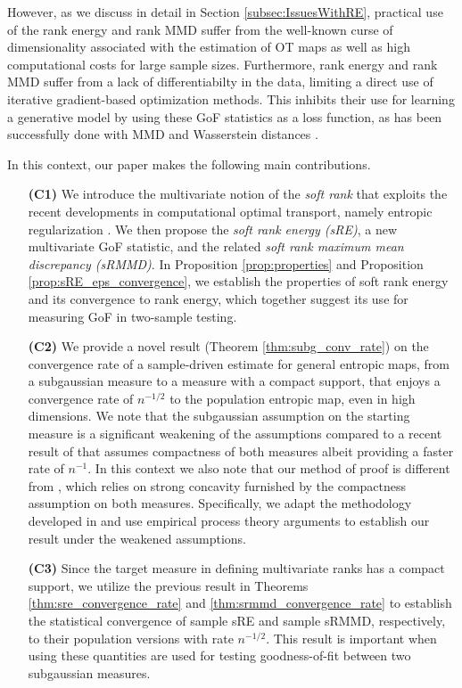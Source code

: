 \documentclass{article}
\theoremstyle{definition}
\begin{document}
However, as we discuss in detail in Section \ref{subsec:IssuesWithRE}, practical use of the rank energy and rank MMD suffer from the well-known curse of dimensionality associated with the estimation of OT maps as well as high computational costs for large sample sizes. Furthermore, rank energy and rank MMD suffer from a lack of differentiabilty in the data, limiting a direct use of iterative gradient-based optimization methods.  This inhibits their use for learning a generative model by using these GoF statistics as a loss function, as has been successfully done with MMD and Wasserstein distances \cite{li2017mmd, arjovsky2017wasserstein}.

In this context, our paper makes the following main contributions.
\begin{itemize}
    \item[\textbf{(C1)}] We introduce the multivariate notion of the \textit{soft rank} that exploits the recent developments in computational optimal transport, namely entropic regularization \cite{peyre2019computational}.  We then propose the \textit{soft rank energy (sRE)}, a new multivariate GoF statistic, and the related \emph{soft rank maximum mean discrepancy (sRMMD)}.  In Proposition \ref{prop:properties} and Proposition \ref{prop:sRE_eps_convergence}, we establish the  properties of soft rank energy and its convergence to rank energy, which together suggest its use for measuring GoF in two-sample testing. 
    
    \item[\textbf{(C2)}]  We provide a novel result (Theorem \ref{thm:subg_conv_rate}) on the convergence rate of a sample-driven estimate for general entropic maps, from a subgaussian measure to a measure with a compact support, that enjoys a convergence rate of $n^{-1/2}$ to the population entropic map, even in high dimensions. We note that the subgaussian assumption on the starting measure is a significant weakening of the assumptions compared to a recent result of \cite{rigollet2022sample} that assumes compactness of both measures albeit providing a faster rate of $n^{-1}$. In this context we also note that our method of proof is different from \cite{rigollet2022sample}, which relies on strong concavity furnished by the compactness assumption on both measures. Specifically, we adapt the methodology developed in \cite{pooladian2021entropic} and use empirical process theory arguments to establish our result under the weakened assumptions.
    
\item [\textbf{(C3)}] Since the target measure in defining multivariate ranks has a compact support, we utilize the previous result in Theorems \ref{thm:sre_convergence_rate} and \ref{thm:srmmd_convergence_rate} to establish the statistical convergence of sample sRE and sample sRMMD, respectively, to their population versions with rate $n^{-1/2}$. This result is important when using these quantities are used for testing goodness-of-fit between two subgaussian measures. 


\end{itemize}
\end{document}
